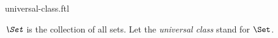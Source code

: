 \documentclass{stex}
\begin{document}
\begin{smodule}{universal-class.ftl}

\begin{definition}[forthel]
  $\emph{\Set}$ is the collection of all sets.
  Let the \emph{universal class} stand for $\Set$.
\end{definition}
\end{smodule}
\end{document}
